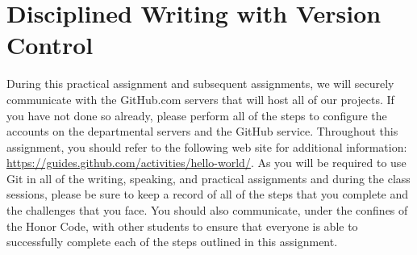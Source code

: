 \section*{Disciplined Writing with Version Control}

During this practical assignment and subsequent assignments, we will securely communicate with the GitHub.com servers
that will host all of our projects. If you have not done so already, please perform all of the steps to configure the
accounts on the departmental servers and the GitHub service. Throughout this assignment, you should refer to the
following web site for additional information: \url{https://guides.github.com/activities/hello-world/}. As you will be
required to use Git in all of the writing, speaking, and practical assignments and during the class sessions, please be
sure to keep a record of all of the steps that you complete and the challenges that you face. You should also
communicate, under the confines of the Honor Code, with other students to ensure that everyone is able to
successfully complete each of the steps outlined in this assignment.

